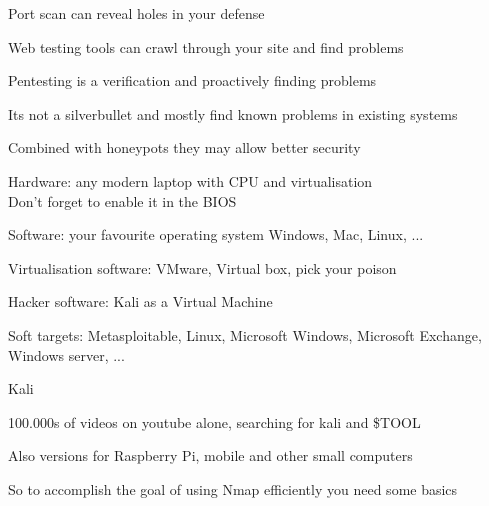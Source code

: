 \documentclass[Screen16to9,17pt]{foils}
\begin{document}

\begin{list2}
\item Port scan can reveal holes in your defense
\item Web testing tools can crawl through your site and find problems
\item Pentesting is a verification and proactively finding problems
\item Its not a silverbullet and mostly find known problems in existing systems
\item Combined with honeypots they may allow better security
\end{list2}



\begin{list2}
\item Hardware: any modern laptop with CPU and virtualisation\\
Don't forget to enable it in the BIOS
\item Software: your favourite operating system Windows, Mac, Linux, ...
\item Virtualisation software: VMware, Virtual box, pick your poison
\item Hacker software: Kali as a Virtual Machine 
\item Soft targets: Metasploitable, Linux, Microsoft Windows, Microsoft Exchange, Windows server, ...
\end{list2}



\begin{list1}
\item  Kali 
\item 100.000s of videos on youtube alone, searching for kali and \$TOOL
\item Also versions for Raspberry Pi, mobile and other small computers
\end{list1}





So to accomplish the goal of using Nmap efficiently you need some basics
\end{document}
